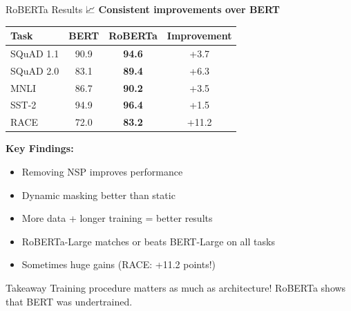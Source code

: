 \documentclass[aspectratio=169]{beamer}
\begin{document}
\begin{frame}{RoBERTa Results 📈}
\small
\textbf{Consistent improvements over BERT}

\vspace{1em}

\begin{center}
\begin{tabular}{lccc}
\toprule
\textbf{Task} & \textbf{BERT} & \textbf{RoBERTa} & \textbf{Improvement} \\
\midrule
SQuAD 1.1 & 90.9 & \textbf{94.6} & +3.7 \\
SQuAD 2.0 & 83.1 & \textbf{89.4} & +6.3 \\
MNLI & 86.7 & \textbf{90.2} & +3.5 \\
SST-2 & 94.9 & \textbf{96.4} & +1.5 \\
RACE & 72.0 & \textbf{83.2} & +11.2 \\
\bottomrule
\end{tabular}
\end{center}

\vspace{1em}

\textbf{Key Findings:}
\begin{itemize}\setlength{\itemsep}{0pt}
    \item \alert{Removing NSP improves performance}
    \item Dynamic masking better than static
    \item More data + longer training = better results
    \item RoBERTa-Large matches or beats BERT-Large on all tasks
    \item Sometimes huge gains (RACE: +11.2 points!)
\end{itemize}

\vspace{0.5em}

\begin{block}{Takeaway}
Training procedure matters as much as architecture! RoBERTa shows that BERT was undertrained.
\end{block}
\end{frame}
\end{document}
